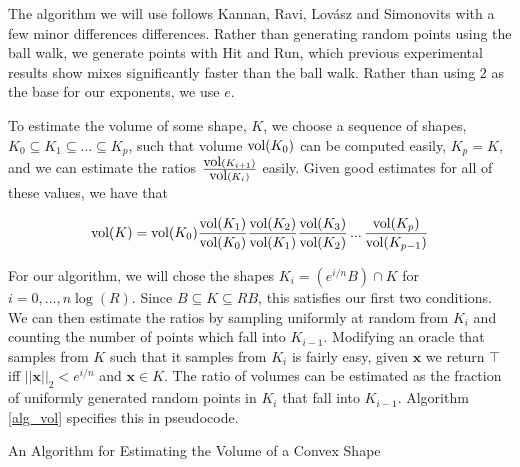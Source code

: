 The algorithm we will use follows Kannan, Ravi, Lov\'{a}sz and Simonovits \cite{Kannan97} with a few minor differences differences. Rather than generating random points using the ball walk, we generate points with Hit and Run, which previous experimental results show mixes significantly faster than the ball walk. Rather than using $2$ as the base for our exponents, we use $e$.

To estimate the volume of some shape, $K$, we choose a sequence of shapes, $K_0 \subseteq K_1 \subseteq ... \subseteq K_p$, such that volume $\mbox{vol} (K_0)$ can be computed easily, $K_p = K$, and we can estimate the ratios $\frac{\mbox{vol}(K_{i+1})}{\mbox{vol}(K_i)}$ easily. Given good estimates for all of these values, we have that

$$
\mbox{vol}(K) = \mbox{vol}(K_0) \frac{\mbox{vol}(K_1)}{\mbox{vol}(K_0)} \frac{\mbox{vol}(K_2)}{\mbox{vol}(K_1)} \frac{\mbox{vol}(K_3)}{\mbox{vol}(K_2)} \, ... \, \frac{\mbox{vol}(K_p)}{\mbox{vol}(K_{p-1})}
$$

For our algorithm, we will chose the shapes $K_i = (e^{i/n}B) \cap K$ for $i = 0, ..., n \log (R)$. Since $B \subseteq K \subseteq RB$, this satisfies our first two conditions. We can then estimate the ratios by sampling uniformly at random from $K_i$ and counting the number of points which fall into $K_{i-1}$. Modifying an oracle that samples from $K$ such that it samples from $K_i$ is fairly easy, given ${\bm x}$ we return $\top$ iff $||{\bm x}||_2 < e^{i/n}$ and ${\bm x} \in K$. The ratio of volumes can be estimated as the fraction of uniformly generated random points in $K_i$ that fall into $K_{i-1}$. Algorithm \ref{alg_vol} specifies this in pseudocode.

\begin{algorithm}
\SetAlgoLined
{}

\caption{An Algorithm for Estimating the Volume of a Convex Shape}\label{alg_vol}

\end{algorithm}

